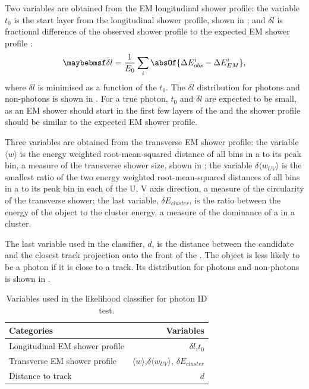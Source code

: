 Two variables are obtained from the EM longitudinal shower profile: the variable $t_0$ is the start layer from the longitudinal shower profile, shown in ; and $\delta{l}$ is fractional difference of the observed shower profile to the expected EM shower profile \cite{Thomson:2009rp}:
\begin{equation}
\delta l = \frac{1}{E_0}\sum_{i}^{}\absOf{\Delta E_{obs}^i - \Delta E_{EM}^i },
\end{equation}
where $\delta l$ is minimised as a function of the $t_0$. The $\delta l$ distribution for photons and non-photons is shown in . For a true photon, $t_0$  and $\delta l $ are expected to be small, as an EM shower should start in the first few layers of the \ECAL and the shower profile should be similar to the expected EM shower profile.

Three variables are obtained from the transverse EM shower profile: the variable $\langle{w}\rangle$ is the energy weighted root-mean-squared distance of all bins in a \ShowerPeak to its peak bin, a measure of the transverse shower size, shown in ; the variable $\delta{\langle{w_{UV}}\rangle}$ is the smallest ratio of the two energy weighted root-mean-squared distances of all bins in a \ShowerPeak to its peak bin in each of the U, V axis direction, a measure of the circularity of the transverse shower; the last variable, $\delta E_{cluster}$, is the  ratio between the energy of the \ShowerPeak object to the cluster energy, a measure of the dominance of a \ShowerPeak in a cluster.

The last variable used in the classifier, $d$, is the distance between the candidate and the closest track projection onto the front of the \ECAL. The \ShowerPeak object is less likely to be a photon if it is close to a track. Its distribution for photons and non-photons is shown in .


\begin{table}[htbp] \centering \smallskip
\begin{tabular}{l r }
\hline
\hline
Categories&  Variables\\
\hline
Longitudinal EM shower profile & $\delta{l}$,$t_0$ \\
Transverse EM shower profile & $\langle{w}\rangle$,$\delta{\langle{w_{UV}}\rangle}$, $\delta E_{cluster}$ \\
Distance to track &  $d$ \\
\hline
\hline
\end{tabular}
\caption
{Variables used in the likelihood classifier for photon ID test.}
\label{tab:photonPhotonIDvar}
\end{table}

